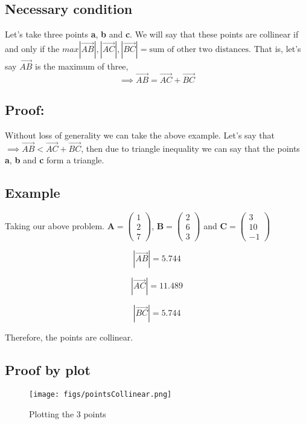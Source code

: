 \documentclass[journal,12pt,twocolumn]{IEEEtran}
\begin{document}
\subsection{Necessary condition}
Let's take three points \textbf{a}, \textbf{b} and \textbf{c}. We will say that these points are collinear if and only if the $max{|\overrightarrow{AB}|, |\overrightarrow{AC}|, |\overrightarrow{BC}|} = 
\text{sum of other two distances}$. That is, let's say $\overrightarrow{AB}$ is the maximum of three, 
$$\implies \overrightarrow{AB} = \overrightarrow{AC} + \overrightarrow{BC}$$
\subsection{Proof:}
Without loss of generality we can take the above example. Let's say that $\implies \overrightarrow{AB} < \overrightarrow{AC} + \overrightarrow{BC}$, then due to triangle inequality we can say that 
the points \textbf{a}, \textbf{b} and \textbf{c} form a triangle.

\subsection{Example}
Taking our above problem.
 $\textbf{A} = \begin{pmatrix} 1 \\ 2 \\ 7 \end{pmatrix}$, $\textbf{B} = \begin{pmatrix} 2 \\ 6 \\ 3 
\end{pmatrix}$ and $\textbf{C} = \begin{pmatrix} 3 \\ 10 \\ -1 \end{pmatrix}$

\begin{equation}
    |\overrightarrow{AB}| = 5.744
\end{equation}

\begin{equation}
    |\overrightarrow{AC}| = 11.489
\end{equation}

\begin{equation}
    |\overrightarrow{BC}| = 5.744
\end{equation}

Therefore, the points are collinear.

\subsection{Proof by plot}
\begin{figure}[ht]
    \centering
    \texttt{[image: figs/pointsCollinear.png]}
    \caption{Plotting the 3 points}
    \label{fig:collinearPoints}
\end{figure}
\end{document}
